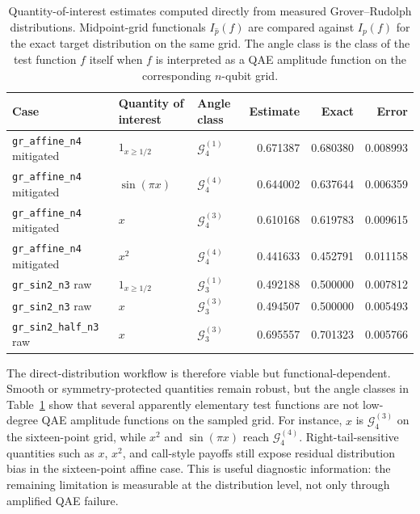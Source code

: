 \begin{table}[h]
\centering
\small
\begin{tabular}{lllrrr}
\toprule
Case & Quantity of interest & Angle class & Estimate & Exact & Error \\
\midrule
\texttt{gr\_affine\_n4} mitigated & \(1_{x\ge 1/2}\) & \(\mathcal{G}^{(1)}_4\) & 0.671387 & 0.680380 & 0.008993 \\
\texttt{gr\_affine\_n4} mitigated & \(\sin(\pi x)\) & \(\mathcal{G}^{(4)}_4\) & 0.644002 & 0.637644 & 0.006359 \\
\texttt{gr\_affine\_n4} mitigated & \(x\) & \(\mathcal{G}^{(3)}_4\) & 0.610168 & 0.619783 & 0.009615 \\
\texttt{gr\_affine\_n4} mitigated & \(x^2\) & \(\mathcal{G}^{(4)}_4\) & 0.441633 & 0.452791 & 0.011158 \\
\texttt{gr\_sin2\_n3} raw & \(1_{x\ge 1/2}\) & \(\mathcal{G}^{(1)}_3\) & 0.492188 & 0.500000 & 0.007812 \\
\texttt{gr\_sin2\_n3} raw & \(x\) & \(\mathcal{G}^{(3)}_3\) & 0.494507 & 0.500000 & 0.005493 \\
\texttt{gr\_sin2\_half\_n3} raw & \(x\) & \(\mathcal{G}^{(3)}_3\) & 0.695557 & 0.701323 & 0.005766 \\
\bottomrule
\end{tabular}
\caption{Quantity-of-interest estimates computed directly from measured
Grover--Rudolph distributions. Midpoint-grid functionals \(I_{\hat p}(f)\) are
compared against \(I_p(f)\) for the exact target distribution on the same grid.
The angle class is the class of the test function \(f\) itself when \(f\) is
interpreted as a QAE amplitude function on the corresponding \(n\)-qubit grid.}
\label{tab:gr-functional-estimates}
\end{table}

The direct-distribution workflow is therefore viable but functional-dependent.
Smooth or symmetry-protected quantities remain robust, but the angle classes in
Table~\ref{tab:gr-functional-estimates} show that several apparently elementary
test functions are not low-degree QAE amplitude functions on the sampled grid.
For instance, \(x\) is \(\mathcal{G}^{(3)}_4\) on the sixteen-point grid, while
\(x^2\) and \(\sin(\pi x)\) reach \(\mathcal{G}^{(4)}_4\). Right-tail-sensitive
quantities such as \(x\), \(x^2\), and call-style payoffs still expose residual
distribution bias in the sixteen-point affine case. This is useful diagnostic
information: the remaining limitation is measurable at the distribution level,
not only through amplified QAE failure.

